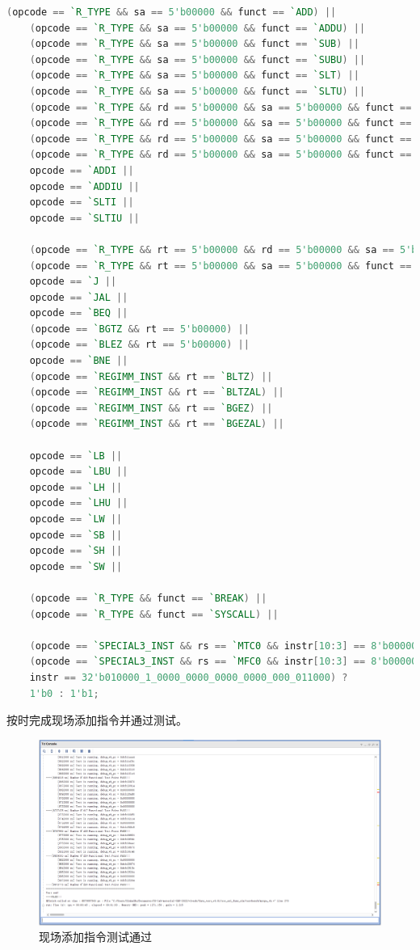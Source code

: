 \begin{lstlisting}[language=Verilog]
    (opcode == `R_TYPE && sa == 5'b00000 && funct == `ADD) ||
    (opcode == `R_TYPE && sa == 5'b00000 && funct == `ADDU) ||
    (opcode == `R_TYPE && sa == 5'b00000 && funct == `SUB) ||
    (opcode == `R_TYPE && sa == 5'b00000 && funct == `SUBU) ||
    (opcode == `R_TYPE && sa == 5'b00000 && funct == `SLT) ||
    (opcode == `R_TYPE && sa == 5'b00000 && funct == `SLTU) ||
    (opcode == `R_TYPE && rd == 5'b00000 && sa == 5'b00000 && funct == `MULT) ||
    (opcode == `R_TYPE && rd == 5'b00000 && sa == 5'b00000 && funct == `MULTU) ||
    (opcode == `R_TYPE && rd == 5'b00000 && sa == 5'b00000 && funct == `DIV) ||
    (opcode == `R_TYPE && rd == 5'b00000 && sa == 5'b00000 && funct == `DIVU) ||
    opcode == `ADDI ||
    opcode == `ADDIU ||
    opcode == `SLTI ||
    opcode == `SLTIU ||
    
    (opcode == `R_TYPE && rt == 5'b00000 && rd == 5'b00000 && sa == 5'b00000 && funct == `JR) ||
    (opcode == `R_TYPE && rt == 5'b00000 && sa == 5'b00000 && funct == `JALR) ||
    opcode == `J ||
    opcode == `JAL ||
    opcode == `BEQ ||
    (opcode == `BGTZ && rt == 5'b00000) ||
    (opcode == `BLEZ && rt == 5'b00000) ||
    opcode == `BNE ||
    (opcode == `REGIMM_INST && rt == `BLTZ) ||
    (opcode == `REGIMM_INST && rt == `BLTZAL) ||
    (opcode == `REGIMM_INST && rt == `BGEZ) ||
    (opcode == `REGIMM_INST && rt == `BGEZAL) ||

    opcode == `LB ||
    opcode == `LBU ||
    opcode == `LH ||
    opcode == `LHU ||
    opcode == `LW ||
    opcode == `SB ||
    opcode == `SH ||
    opcode == `SW ||
    
    (opcode == `R_TYPE && funct == `BREAK) ||
    (opcode == `R_TYPE && funct == `SYSCALL) ||
    
    (opcode == `SPECIAL3_INST && rs == `MTC0 && instr[10:3] == 8'b00000000) ||
    (opcode == `SPECIAL3_INST && rs == `MFC0 && instr[10:3] == 8'b00000000) ||
    instr == 32'b010000_1_0000_0000_0000_0000_000_011000) ?
    1'b0 : 1'b1;
\end{lstlisting}

按时完成现场添加指令并通过测试。

\begin{figure}[H]
    \centering
    \includegraphics[width=\textwidth]{image/现场添加指令测试通过.png}
    \caption{现场添加指令测试通过}
    \label{fig:现场添加指令测试通过}
\end{figure}


